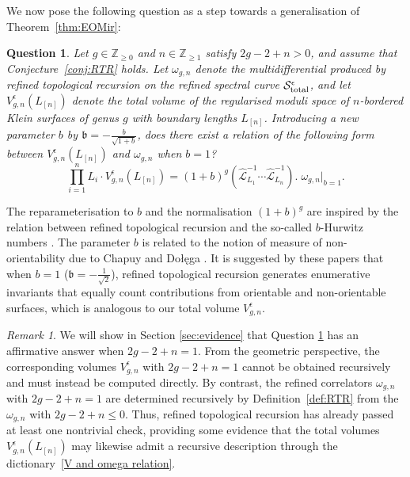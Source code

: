 \documentclass[12pt]{amsart}
\theoremstyle{plain}
\newtheorem{question}[theorem]{Question}
\theoremstyle{definition}
\theoremstyle{remark}
\newtheorem{remark}[theorem]{Remark}
\numberwithin{equation}{section}
\begin{document}
We now pose the following question as a step towards a generalisation of Theorem~\ref{thm:EOMir}:

\begin{question}\label{conj:main}
   Let $g\in\mathbb{Z}_{\geq0}$ and $n\in\mathbb{Z}_{\geq1}$ satisfy $2g-2+n>0$, and assume that Conjecture~\ref{conj:RTR} holds. Let $\omega_{g,n}$ denote the multidifferential produced by refined topological recursion on the refined spectral curve $\mathcal{S}^{\epsilon}_{\textup{total}}$, and let $V_{g,n}^\epsilon(L_{[n]})$ denote the total volume of the regularised moduli space of $n$-bordered Klein surfaces of genus $g$ with boundary lengths $L_{[n]}$.
 Introducing a new parameter $b$ by $\mathfrak{b} = -\frac{b}{\sqrt{1+b}}$, does there exist a relation of the following form between $V_{g,n}^\epsilon(L_{[n]})$ and $\omega_{g,n}$ when $b=1$?
    \begin{equation}
     \prod_{i=1}^nL_i\cdot V_{g,n}^\epsilon(L_{[n]})= (1+b)^{g}(\hat{\mathcal{L}}_{L_1}^{-1}\cdots \hat{\mathcal{L}}_{L_n}^{-1}).\;\omega_{g,n}\Big|_{b=1}.\label{V and omega relation}
    \end{equation}
\end{question}
The reparameterisation to $b$ and the normalisation $(1+b)^g$ are inspired by the relation between refined topological recursion and the so-called $b$-Hurwitz numbers \cite{CDO24-1,CDO24-2}. The parameter $b$ is related to the notion of measure of non-orientability due to Chapuy and Do\l\k{e}ga \cite{CD20}. It is suggested by these papers that when $b=1$ ($\mathfrak{b}=-\frac{1}{\sqrt{2}}$), refined topological recursion generates enumerative invariants that equally count contributions from orientable and non-orientable surfaces, which is analogous to our total volume $V_{g,n}^\epsilon$.

\begin{remark}
We will show in Section \ref{sec:evidence} that Question \ref{conj:main} has an affirmative answer when $2g-2+n=1$. From the geometric perspective, the corresponding volumes $V^\epsilon_{g,n}$ with $2g-2+n=1$ cannot be obtained recursively and must instead be computed directly. By contrast, the refined correlators $\omega_{g,n}$ with $2g-2+n=1$ are determined recursively by Definition~\ref{def:RTR} from the $\omega_{g,n}$ with $2g-2+n\leq0$. Thus, refined topological recursion has already passed at least one nontrivial check, providing some evidence that the total volumes $V_{g,n}^\epsilon(L_{[n]})$ may likewise admit a recursive description through the dictionary~\eqref{V and omega relation}.
\end{remark}
\end{document}
